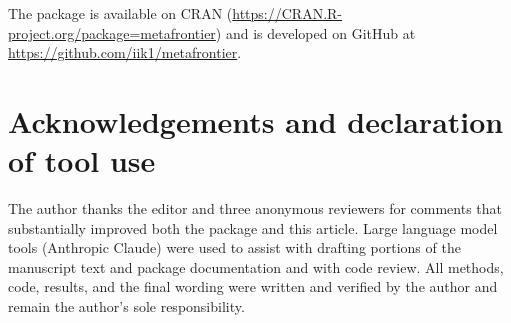 The package is available on CRAN
(\url{https://CRAN.R-project.org/package=metafrontier}) and is developed
on GitHub at \url{https://github.com/iik1/metafrontier}.

\section*{Acknowledgements and declaration of tool use}\label{acknowledgements-and-declaration-of-tool-use}

The author thanks the editor and three anonymous reviewers for comments
that substantially improved both the package and this article. Large
language model tools (Anthropic Claude) were used to assist with drafting
portions of the manuscript text and package documentation and with code
review. All methods, code, results, and the final wording were written
and verified by the author and remain the author's sole responsibility.



\address{%
Erik Enstad\\
NHH Norwegian School of Economics\\%
Department of Business and Management Science\\ Bergen, Norway\\
%
%
\textit{ORCID: \href{https://orcid.org/0009-0006-1053-3849}{0009-0006-1053-3849}}\\%
\href{mailto:erik.enstad@nhh.no}{\nolinkurl{erik.enstad@nhh.no}}%
}
